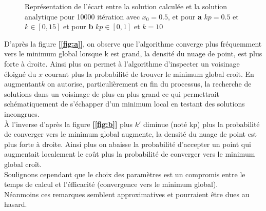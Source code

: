 \documentclass[12pt]{article}
\begin{document}
\begin{figure}[H]
  \centering
  \caption{Représentation de l'écart entre la solution calculée et la solution analytique pour 10000 itération avec $x_0 = 0.5$, et pour \textbf{a} $kp=0.5$ et $k\in [0,15]$ et  pour \textbf{b} $kp \in [0,1]$ et $k= 10$}
  \label{fig:ab}
\end{figure}
D'après la figure \textbf{[\ref{fig:a}]}, on observe que l'algorithme converge plus fréquemment vers le minimum global lorsque k est grand, la densité du nuage de point, est plus forte à droite. Ainsi plus on permet à l'algorithme d'inspecter un voisinage éloigné du $x$ courant plus  la probabilité de trouver le minimum global croit. En augmentant$k$ on autorise, particulièrement en fin du processus, la recherche de solutions dans un voisinage de plus en plus grand  ce qui permettrait schématiquement de  s'échapper d'un minimum local en testant des solutions incongrues.\\ 
 À l'inverse d'après la figure \textbf{[\ref{fig:b}]} plus $k'$ diminue (noté kp)  plus la probabilité de converger vers le minimum global augmente, la densité du nuage de point est plus forte à droite. Ainsi plus on abaisse la probabilité d'accepter un point qui augmentait localement le coût plus la probabilité de converger vers le minimum global croît.\\
 Soulignons cependant que le choix des paramètres est un compromis entre le temps de calcul et l'éfficacité (convergence vers le minimum global).\\
 Néanmoins ces remarques semblent approximatives et pourraient être dues au hasard.\\
 
\end{document}
